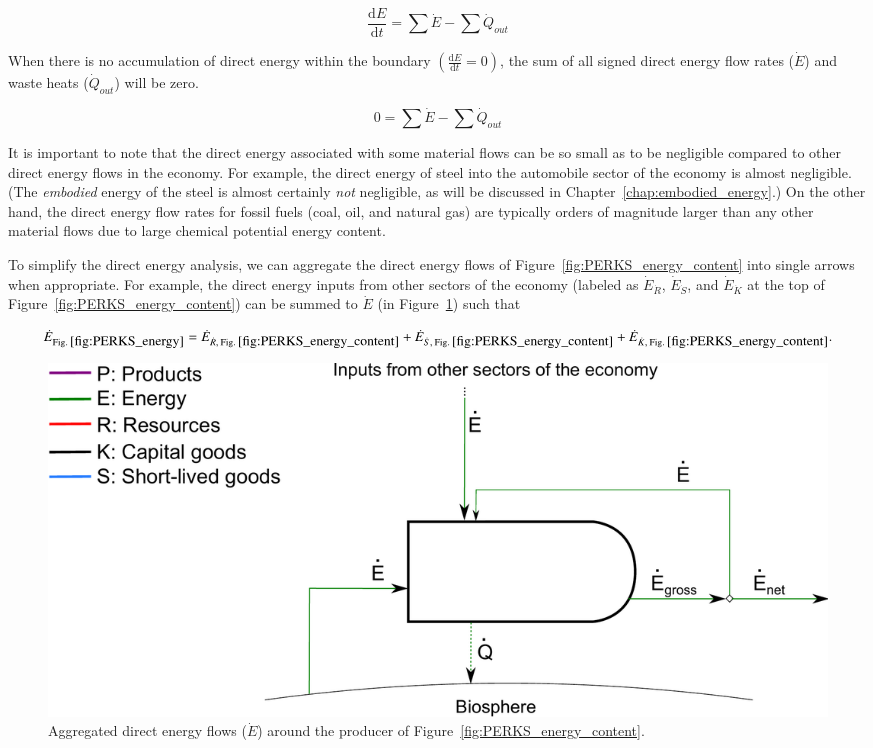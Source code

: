 \begin{equation} \label{eq:First_Law_with_accumulation}
	\frac{\mathrm{d}E}{\mathrm{d}t} = \sum \dot{E} - \sum \dot{Q}_{out}
\end{equation}

When there is no accumulation of direct energy within the boundary
$\left( \frac{\mathrm{d}E}{\mathrm{d}t} = 0 \right)$, the sum of all 
signed direct energy flow rates ($\dot{E}$) 
and waste heats ($\dot{Q}_{out}$) will be zero.

\begin{equation} \label{eq:First_Law_no_accumulation}
	0 = \sum \dot{E} - \sum \dot{Q}_{out}
\end{equation}

It is important to note that the direct energy associated with some material flows can
be so small as to be negligible compared to other direct energy flows in the economy.
For example, the direct energy of steel into the automobile sector of the economy 
is almost negligible. (The \emph{embodied} energy of the steel is almost certainly
\emph{not} negligible, as will be discussed in Chapter~\ref{chap:embodied_energy}.)
On the other hand, the direct energy flow rates for 
fossil fuels
(coal, oil, and natural gas)
are typically orders of magnitude larger than any other 
material flows due to large chemical potential energy content.

To simplify the direct energy analysis, 
we can aggregate the direct energy flows of Figure~\ref{fig:PERKS_energy_content}
into single arrows when appropriate. 
For example, the direct energy inputs from other sectors of the economy
(labeled as $\dot{E}_{\dot{R}}$, $\dot{E}_{\dot{S}}$, and $\dot{E}_{\dot{K}}$ 
at the top of Figure~\ref{fig:PERKS_energy_content}) can be summed to $\dot{E}$ 
(in Figure~\ref{fig:PERKS_energy}) such that

\begin{equation} \label{eq:direct_energy_aggregation}
	\dot{E}_{\mathrm{Fig.\:\ref{fig:PERKS_energy}}} 
	= \dot{E}_{\dot{R},\:\mathrm{Fig.\:\ref{fig:PERKS_energy_content}}} 
	+ \dot{E}_{\dot{S},\:\mathrm{Fig.\:\ref{fig:PERKS_energy_content}}} 
	+ \dot{E}_{\dot{K},\:\mathrm{Fig.\:\ref{fig:PERKS_energy_content}}}.
\end{equation}

\begin{figure}[!ht]
\centering
\includegraphics[width=0.8\linewidth]{Part_1/Chapter_Energy/images/PERKS_basic_unit_energy.pdf}
\caption[Aggregated direct energy flows for a single sector]{Aggregated direct energy flows ($\dot{E}$) around 
the producer of Figure~\ref{fig:PERKS_energy_content}.}
\label{fig:PERKS_energy}
\end{figure}


